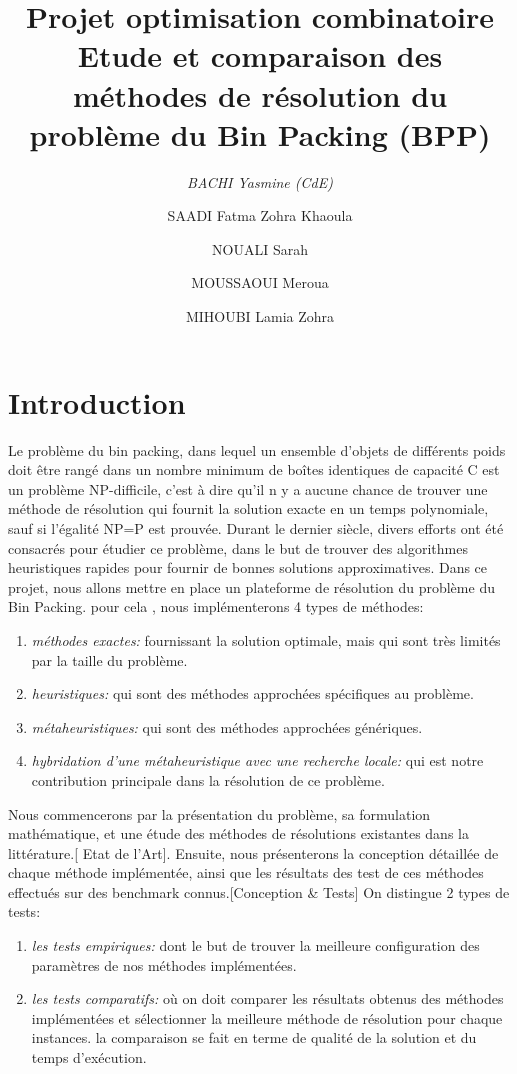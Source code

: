 \documentclass[12pt,a4paper, titlepage]{report}
\title{Projet optimisation combinatoire\\ Etude et comparaison des méthodes de résolution du problème du Bin Packing (BPP)}
\author{ 
    \emph{BACHI Yasmine (CdE)}
    \and
    SAADI Fatma Zohra Khaoula
    \and 
    NOUALI Sarah
    \and 
    MOUSSAOUI Meroua
    \and 
    MIHOUBI Lamia Zohra}
\begin{document}
    \maketitle
    
    \tableofcontents
    \chapter*{Introduction}
      
    Le problème du bin packing, dans lequel un ensemble d’objets de différents poids doit être rangé dans un nombre minimum de boîtes identiques de capacité C est un problème NP-difficile, c’est à dire qu’il n y a aucune chance de trouver une méthode de résolution qui fournit la solution exacte en un temps polynomiale, sauf si l’égalité NP=P est prouvée. 
    Durant le dernier siècle, divers efforts ont été consacrés pour étudier ce problème, dans le but de trouver des algorithmes heuristiques rapides pour fournir de bonnes solutions approximatives.
    Dans ce projet, nous allons mettre en place un plateforme de résolution du problème du Bin Packing. pour cela , nous implémenterons 4 types de méthodes: 
    \begin{enumerate}
        \item \emph{méthodes exactes:} fournissant la solution optimale, mais qui sont très limités par la taille du problème. 
        \item \emph{heuristiques:} qui sont des méthodes approchées spécifiques au problème.
        \item \emph{métaheuristiques:} qui sont des méthodes approchées génériques.
        \item \emph{hybridation d'une métaheuristique avec une recherche locale:} qui est notre contribution principale dans la résolution de ce problème.
    \end{enumerate}
    Nous commencerons par la présentation du problème, sa formulation mathématique, et une étude des méthodes de résolutions existantes dans la littérature.[ Etat de l’Art]. Ensuite, nous présenterons la conception détaillée de chaque méthode implémentée, ainsi que les résultats des test de ces méthodes effectués sur des benchmark connus.[Conception \& Tests]
    On distingue 2 types de tests:
    \begin{enumerate}
        \item \emph{les tests empiriques:} dont le but de trouver la meilleure configuration des paramètres de nos méthodes implémentées.  
        \item \emph{les tests comparatifs:} où on doit comparer les résultats obtenus des méthodes implémentées et sélectionner la meilleure méthode de résolution pour chaque instances. la comparaison se fait en terme de qualité de la solution et du temps d'exécution. 
    \end{enumerate}
\end{document}
